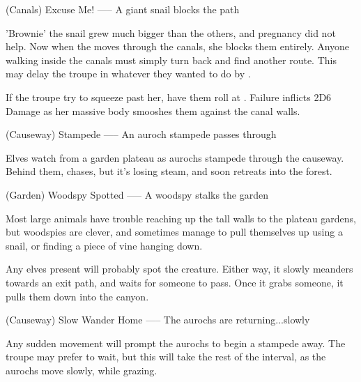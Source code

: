 (Canals) Excuse Me!
-----
{A giant snail blocks the path}

'Brownie' the snail grew much bigger than the others, and pregnancy did not help.
Now when the moves through the canals, she blocks them entirely.
Anyone walking inside the canals must simply turn back and find another route.
This may delay the troupe in whatever they wanted to do by .

If the troupe try to squeeze past her, have them roll  at \tn[8].
Failure inflicts 2D6 Damage as her massive body smooshes them against the canal walls.

(Causeway) Stampede
-----
{An auroch stampede passes through}

Elves watch from a garden plateau as aurochs stampede through the causeway.
Behind them,  chases, but it's losing steam, and soon retreats into the forest.

(Garden) Woodspy Spotted
-----
{A woodspy stalks the garden}

Most large animals have trouble reaching up the tall walls to the plateau gardens, but woodspies are clever, and sometimes manage to pull themselves up using a snail, or finding a piece of vine hanging down.

Any elves present will probably spot the creature.
Either way, it slowly meanders towards an exit path, and waits for someone to pass.
Once it grabs someone, it pulls them down into the canyon.

(Causeway) Slow Wander Home
-----
{The aurochs are returning...slowly}

Any sudden movement will prompt the aurochs to begin a stampede away.
The troupe may prefer to wait, but this will take the rest of the \gls{interval}, as the aurochs move slowly, while grazing.


